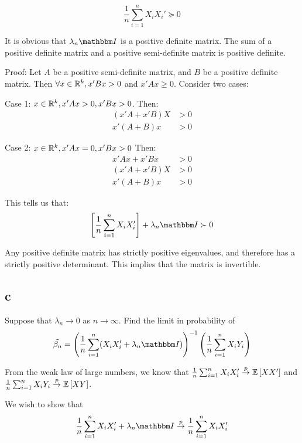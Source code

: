 \documentclass[12pt]{paper}
\begin{document}
\begin{equation*}
  \frac{1}{n} \sum_{i=1}^n  X_i X_i' \succeq 0
\end{equation*}

It is obvious that $\lambda_n \eye$ is a positive definite matrix. The sum
of a positive definite matrix and a positive semi-definite matrix is
positive definite.

Proof: Let $A$ be a positive semi-definite matrix, and $B$ be a
positive definite matrix. Then $\forall x \in \mathbb{R}^k, x' B x > 0$ and $x' A x
\geq 0$. Consider two cases:

Case 1: $x \in \mathbb{R}^k, x' A x > 0, x' B x > 0$. Then:
\begin{align*}
  \left( x' A + x' B \right) X &> 0\\
  x' ( A + B ) x &> 0
\end{align*}

Case 2: $x \in \mathbb{R}^k, x' A x = 0, x' B x > 0$ Then:
\begin{align*}
  x' A x + x' B x &> 0\\
  \left( x' A + x' B \right) X &> 0\\
  x' ( A + B ) x &> 0
\end{align*}

This tells us that:
\begin{equation*}
  \brak{\frac{1}{n} \sum_{i=1}^n  X_i X_i'} + \lambda_n \eye \succ 0
\end{equation*}

Any positive definite matrix has strictly positive eigenvalues, and
therefore has a strictly positive determinant. This implies that the
matrix is invertible.

\subsection*{c}

Suppose that $\lambda_n \rightarrow 0$ as $n \rightarrow \infty$. Find the limit in probability of
\begin{equation*}
  \tilde{\beta_n} = \inv{ \left( \frac{1}{n} \sum_{i=1}^n ( X_i X_i' + \lambda_n
      \eye) \right)} \left( \frac{1}{n} \sum_{i=1}^n X_i Y_i \right)
\end{equation*}

From the weak law of large numbers, we know that $\frac{1}{n}
\sum_{i=1}^n X_i X_i' \overset{p}{\to} \mathbb{E} \left [ X X' \right ]$ and $\frac{1}{n} \sum_{i=1}^n X_i
Y_i \overset{p}{\to} \mathbb{E} \left [ XY \right ]$.

We wish to show that
\begin{equation*}
  \frac{1}{n} \sum_{i=1}^n X_i X_i' + \lambda_n \eye \plim \frac{1}{n} \sum_{i=1}^n X_i X_i'
\end{equation*}
\end{document}
